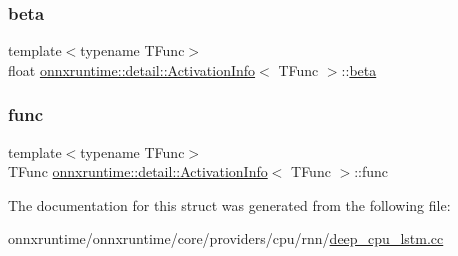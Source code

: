 \subsubsection{\texorpdfstring{beta}{beta}}
{\footnotesize\ttfamily template$<$typename T\+Func$>$ \\
float \mbox{\hyperlink{structonnxruntime_1_1detail_1_1ActivationInfo}{onnxruntime\+::detail\+::\+Activation\+Info}}$<$ T\+Func $>$\+::\mbox{\hyperlink{mlasi_8h_a5fd37d216981b4cd9a19e29b5acd48d4}{beta}}}

\mbox{\label{structonnxruntime_1_1detail_1_1ActivationInfo_aca31c46eedd34ac66255b1c90736f60f}} 
\subsubsection{\texorpdfstring{func}{func}}
{\footnotesize\ttfamily template$<$typename T\+Func$>$ \\
T\+Func \mbox{\hyperlink{structonnxruntime_1_1detail_1_1ActivationInfo}{onnxruntime\+::detail\+::\+Activation\+Info}}$<$ T\+Func $>$\+::func}



The documentation for this struct was generated from the following file\+:\begin{DoxyCompactItemize}
\item 
onnxruntime/onnxruntime/core/providers/cpu/rnn/\mbox{\hyperlink{deep__cpu__lstm_8cc}{deep\+\_\+cpu\+\_\+lstm.\+cc}}\end{DoxyCompactItemize}
